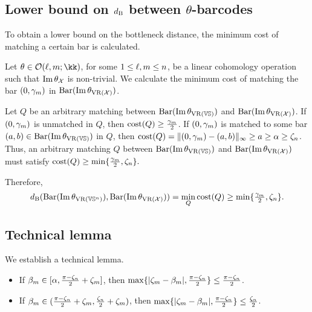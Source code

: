 \subsection{Lower bound on $d_{\mathrm{B}}$ between $\theta$-barcodes}
\label{subsub:db_theta_lower_bound}

To obtain a lower bound on the bottleneck distance, the minimum cost of matching a certain bar is calculated. 

Let $\theta \in \cO(\ell, \degp; \kk)$, for some $1 \leq \ell, m \leq n$, be a linear cohomology operation such that $\operatorname{Im} \theta_{\mathcal{X}}$ is non-trivial.
We calculate the minimum cost of matching the bar $(0,\gamma_m )$ in $\operatorname{Bar}(\operatorname{Im} \theta_{\operatorname{VR}(\mathcal{X})})$.

Let $Q$ be an arbitrary matching between $\operatorname{Bar}(\operatorname{Im} \theta_{\operatorname{VR}(\mathbb{V}\mathbb{S})})$ and $\operatorname{Bar}(\operatorname{Im} \theta_{\operatorname{VR}(\mathcal{X})})$.
If $(0,\gamma_m )$ is unmatched in $Q$, then $\mathrm{cost}(Q) \geq \tfrac{\gamma_m }{2}$. 
If $(0,\gamma_m )$ is matched to some bar $(a,b) \in \operatorname{Bar}(\operatorname{Im} \theta_{\operatorname{VR}(\mathbb{V}\mathbb{S})})$ in $Q$, then 
$\mathrm{cost}(Q) =  \|(0,\gamma_m ) - (a,b)\|_\infty \geq  a \geq \alpha \geq \zeta_n$.
Thus, an arbitrary matching $Q$ between $\operatorname{Bar}(\operatorname{Im} \theta_{\operatorname{VR}(\mathbb{V}\mathbb{S})})$ and $\operatorname{Bar}(\operatorname{Im} \theta_{\operatorname{VR}(\mathcal{X})})$ must satisfy $\mathrm{cost}(Q) 
    \geq \min\{\tfrac{\gamma_m }{2}, \zeta_n\}.$
    
Therefore, 
\begin{equation}\label{eq:db_theta_lower_bound}
    \db(\thetabarc{\VS^n}, \thetabarc{\cX})
    = \min_Q \cost(Q) 
    \geq \min\{\tfrac{\gamma_\degp }{2}, \zeta_n\}. %
\end{equation}

\subsection{Technical lemma}
\label{subsub:comparison_lemma}

We establish a technical lemma.  

\medskip\lemma 
\begin{itemize}
    \item If $\beta_m \in [\alpha, \tfrac{\pi - \zeta_n}{2}+\zeta_m]$, then
            $\max\{|\zeta_m  - \beta_m |, \tfrac{\pi - \zeta_n}{2}\}
            \leq \tfrac{\pi - \zeta_n}{2}$.
    \item If $\beta_m \in (\tfrac{\pi - \zeta_n}{2}+\zeta_m, \tfrac{\zeta_n}{2}+\zeta_m)$, then
            $\max\{|\zeta_m  - \beta_m |, \tfrac{\pi - \zeta_n}{2}\}
            \leq \tfrac{\zeta_n}{2}$.
\end{itemize}

